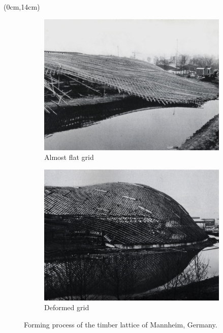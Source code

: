 \documentclass[fleqn]{thesis}
\begin{document}
	\begin{textblock*}{10cm}(0cm,14cm)%
		\setlength{\parskip}{0pt}
		\begin{figure}[t]
			\begin{subfigure}[b]{\TwoMediaWidth}
				\includegraphics[width=\textwidth]{mannheim_erection_1.jpg}
				\caption{Almost flat grid}
				\label{fig:erec_1}
			\end{subfigure}%
			\hspace{\MediaGutterWidth}%
			\begin{subfigure}[b]{\TwoMediaWidth}
				\includegraphics[width=\textwidth]{mannheim_erection_2.jpg}
				\caption{Deformed grid}
				\label{fig:erec_2}
			\end{subfigure}
			\caption[Forming process of the timber lattice of Mannheim, Germany]{Forming process of the timber lattice of Mannheim, Germany.}
			\label{fig:multihalle}
		\end{figure}
	\end{textblock*}
\end{document}
